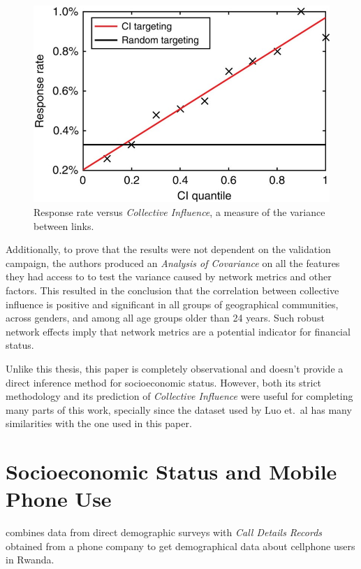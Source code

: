 \begin{figure}
\centering
\includegraphics[height=.25\textheight]{figures/luo2017results.png}
\caption{Response rate versus \emph{Collective Influence}, a measure of the variance between links.}
\label{fig:luo2017results}
\end{figure}

Additionally, to prove that the results were not dependent on the validation campaign, the authors produced an \emph{Analysis of Covariance}\cite{wildt1978analysis} on all the features they had access to to test the variance caused by network metrics and other factors.
This resulted in the conclusion that the correlation between collective influence is positive and significant in all groups of geographical communities, across genders, and among all age groups older than 24 years.
Such robust network effects imply that network metrics are a potential indicator for financial status.

Unlike this thesis, this paper is completely observational and doesn't provide a direct inference method for socioeconomic status. However, both its strict methodology and its prediction of \emph{Collective Influence} were useful for completing many parts of this work, specially since the dataset used by Luo et.\ al has many similarities with the one used in this paper.


\section{Socioeconomic Status and Mobile Phone Use}

\cite{blumenstock2010mobile} combines data from direct demographic surveys with \emph{Call Details Records} obtained from a phone company to get demographical data about cellphone users in Rwanda.

